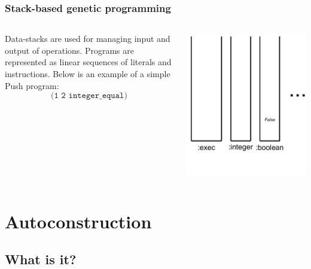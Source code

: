 \documentclass{beamer}
\newcommand{\linespace}{\vskip 0.25cm}
\begin{document}
\begin{frame}
	\frametitle{Stack-based genetic programming}
	\begin{columns}
		\begin{column}{0.6\textwidth}
			Data-stacks are used for managing input and output of operations.
			\linespace
			\linespace
			\linespace
			Programs are represented as linear sequences of literals and instructions. Below is an example of a simple Push program:
			\[\texttt{(1 2 integer\_equal)}\]
		\end{column}
		\begin{column}{0.4\textwidth}
			\includegraphics[height=1.2\textwidth]{Illustrations/stack_10.PDF}
		\end{column}
	\end{columns}
\end{frame}

\section[Autoconstruction]{Autoconstruction}

\subsection{What is it?}
\end{document}
